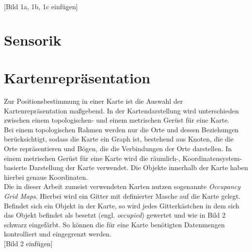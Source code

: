 [Bild 1a, 1b, 1c einfügen]




\section{Sensorik}\label{chap:Sensorik}




\section{Kartenrepräsentation}\label{chap:Kartenrepräsentation}
Zur Positionsbestimmung in einer Karte ist die Auswahl der Kartenrepräsentation maßgebend. In der Kartendarstellung wird unterschieden zwischen einem topologischen- und einem metrischen Gerüst für eine Karte.\\
Bei einem topologischen Rahmen werden nur die Orte und dessen Beziehungen berücksichtigt, sodass die Karte ein Graph ist, bestehend aus Knoten, die die Orte repräsentieren und Bögen, die die Verbindungen der Orte darstellen. In einem metrischen Gerüst für eine Karte wird die räumlich-, Koordinatensystem-basierte Darstellung der Karte verwendet. Die Objekte innerhalb der Karte haben hierbei genaue Koordinaten.\\
Die in dieser Arbeit zumeist verwendeten Karten nutzen sogenannte \textit{Occupancy Grid Maps}. Hierbei wird ein Gitter mit definierter Masche auf die Karte gelegt. Befindet sich ein Objekt in der Karte, so wird jedes Gitterkästchen in dem sich das Objekt befindet als besetzt (engl. \textit{occupied}) gewertet und wie in Bild 2 schwarz eingefärbt. So können die für eine Karte benötigten Datenmengen kontrolliert und eingegrenzt werden.\\

[Bild 2 einfügen]
